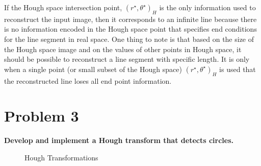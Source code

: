 \documentclass[aps,letterpaper,10pt]{article}
\begin{document}
If the Hough space intersection point, $(r^\star,\theta^\star)_H$ is the only information used to reconstruct the input image, then it corresponds to an infinite line because there is no information encoded in the Hough space point that specifies end conditions for the line segment in real space.  One thing to note is that based on the size of the Hough space image and on the values of other points in Hough space, it should be possible to reconstruct a line segment with specific length.  It is only when a single point (or small subset of the Hough space) $(r^\star,\theta^\star)_H$ is used that the reconstructed line loses all end point information.

\section{Problem 3}
\textbf{Develop and implement a Hough transform that detects circles.}
\begin{figure}[!h]
\centering
{} \hfill
{} \hfill
{}
\caption{Hough Transformations}
\label{fig:8-3}
\end{figure}
\end{document}
